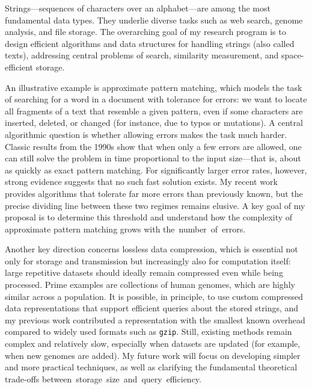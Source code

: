 \documentclass[a4paper,11pt]{article}
\begin{document}
\thispagestyle{firststyle}

Strings—sequences of characters over an alphabet—are among the most fundamental data types. They underlie diverse tasks such as web search, genome analysis, and file storage. The overarching goal of my research program is to design efficient algorithms and data structures for handling strings (also called texts), addressing central problems of search, similarity measurement, and space-efficient storage.

An illustrative example is approximate pattern matching, which models the task of searching for a word in a document with tolerance for errors: we want to locate all fragments of a text that resemble a given pattern, even if some characters are inserted, deleted, or changed (for instance, due to typos or mutations). A central algorithmic question is whether allowing errors makes the task much harder. Classic results from the 1990s show that when only a few errors are allowed, one can still solve the problem in time proportional to the input size—that is, about as quickly as exact pattern matching. For significantly larger error rates, however, strong evidence suggests that no such fast solution exists. My recent work provides algorithms that tolerate far more errors than previously known, but the precise dividing line between these two regimes remains elusive. A key goal of my proposal is to determine this threshold and understand how the complexity of approximate pattern matching grows with \mbox{the number of errors}.

Another key direction concerns lossless data compression, which is essential not only for storage and transmission but increasingly also for computation itself: large repetitive datasets should ideally remain compressed even while being processed. Prime examples are collections of human genomes, which are highly similar across a population. It is possible, in principle, to use custom compressed data representations that support efficient queries about the stored strings, and my previous work contributed a representation with the smallest known overhead compared to widely used formats such as \texttt{gzip}. Still, existing methods remain complex and relatively slow, especially when datasets are updated (for example, when new genomes are added). My future work will focus on developing simpler and more practical techniques, as well as clarifying the fundamental theoretical trade-offs \mbox{between storage size and query efficiency}.
\end{document}
